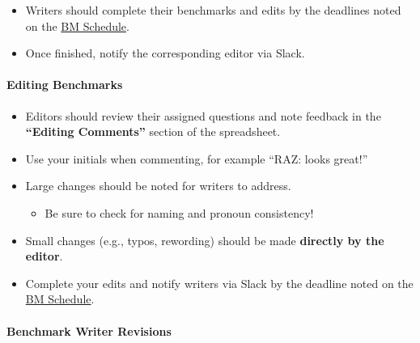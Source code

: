 \documentclass[
]{article}
\providecommand{\tightlist}{%
  \setlength{\itemsep}{0pt}\setlength{\parskip}{0pt}}
\begin{document}
\begin{itemize}
\tightlist
\item
  Writers should complete their benchmarks and edits by the deadlines noted on the \href{https://docs.google.com/spreadsheets/d/1N9WRwAjtkOxEvx-edf1KLUiHobvfGxEd/edit?gid=602524248\#gid=602524248}{BM Schedule}.\\
\item
  Once finished, notify the corresponding editor via Slack.
\end{itemize}

\hypertarget{editing-benchmarks}{%
\paragraph{Editing Benchmarks}\label{editing-benchmarks}}

\begin{itemize}
\tightlist
\item
  Editors should review their assigned questions and note feedback in the \textbf{``Editing Comments''} section of the spreadsheet.\\
\item
  Use your initials when commenting, for example ``RAZ: looks great!''
\item
  Large changes should be noted for writers to address.

  \begin{itemize}
  \tightlist
  \item
    Be sure to check for naming and pronoun consistency!\\
  \end{itemize}
\item
  Small changes (e.g., typos, rewording) should be made \textbf{directly by the editor}.\\
\item
  Complete your edits and notify writers via Slack by the deadline noted on the \href{https://docs.google.com/spreadsheets/d/1N9WRwAjtkOxEvx-edf1KLUiHobvfGxEd/edit?gid=602524248\#gid=602524248}{BM Schedule}.
\end{itemize}

\hypertarget{benchmark-writer-revisions}{%
\paragraph{Benchmark Writer Revisions}\label{benchmark-writer-revisions}}
\end{document}

